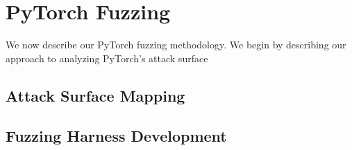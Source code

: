 \section{PyTorch Fuzzing}

We now describe our PyTorch fuzzing methodology. We begin by describing our approach to analyzing PyTorch's attack surface

\subsection{Attack Surface Mapping}
\subsection{Fuzzing Harness Development}
